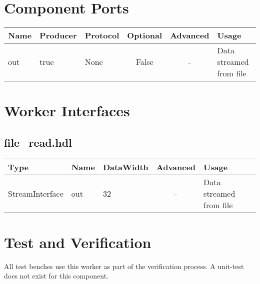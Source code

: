 \documentclass{article}
\def\comp{file\_read}
\begin{document}
\begin{landscape}
	\section*{Component Ports}
	\begin{scriptsize}
\begin{tabular}{|M{2cm}|M{1.5cm}|M{4cm}|c|c|M{9cm}|}
\hline
{}
Name & Producer & Protocol & Optional & Advanced & Usage
\\
\hline
out & true & None& False & - & Data streamed from file\\
\hline
\end{tabular}
	\end{scriptsize}

	\section*{Worker Interfaces}
	\subsection*{\comp.hdl}
	\begin{scriptsize}
\begin{tabular}{|M{2cm}|M{1.5cm}|M{4cm}|c|M{12cm}|}
\hline
{}
Type & Name & DataWidth & Advanced & Usage
\\
\hline
StreamInterface & out & 32 & - & Data streamed from file\\
\hline
\end{tabular}
	\end{scriptsize}
\end{landscape}

\section*{Test and Verification}
\begin{flushleft}
All test benches use this worker as part of the verification process. A unit-test does not exist for this component.
\end{flushleft}
\end{document}
